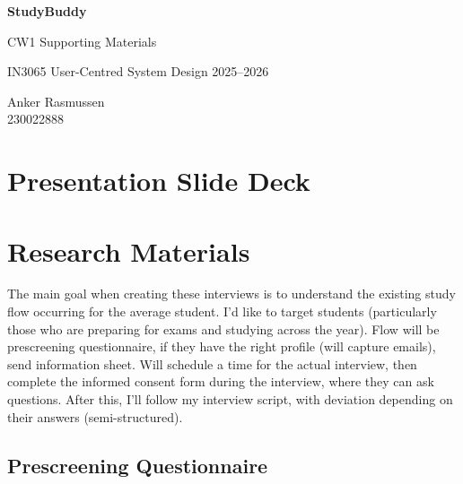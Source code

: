 \documentclass[a4paper,11pt]{article}
\begin{document}
\begin{titlepage}
    \centering
    \vspace*{3cm}
    {\LARGE\bfseries StudyBuddy\par}
    \vspace{0.4cm}
    {\Large CW1 Supporting Materials\par}
    \vspace{1.5cm}
    {\large IN3065 User-Centred System Design 2025--2026\par}
    \vspace{1cm}
    {\large Anker Rasmussen \\230022888\par}
    \vfill
    \newpage
    \tableofcontents
    \vspace{2cm}
\end{titlepage}

\newpage
\section{Presentation Slide Deck}


\newpage
\section{Research Materials}
The main goal when creating these interviews is to understand the existing study flow occurring for the average student.
I'd like to target students (particularly those who are preparing for exams and studying across the year). Flow will be
prescreening questionnaire, if they have the right profile (will capture emails), send information sheet. Will schedule a 
time for the actual interview, then complete the informed consent form during the interview, where they can ask questions.
After this, I'll follow my interview script, with deviation depending on their answers (semi-structured). 


\subsection{Prescreening Questionnaire}

\end{document}
